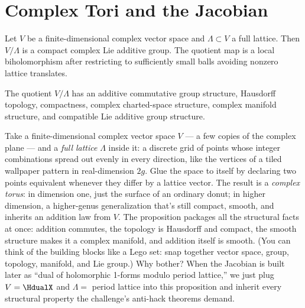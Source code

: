 \section{Complex Tori and the Jacobian}
\label{sec:complex-tori-jacobians}

Let \(V\) be a finite-dimensional complex vector space and \(\Lambda\subset V\)
a full lattice. Then \(V/\Lambda\) is a compact complex Lie additive group.
The quotient map is a local biholomorphism after restricting to sufficiently
small balls avoiding nonzero lattice translates.

\begin{proposition}
\label{prop:complex-torus-package}
The quotient \(V/\Lambda\) has an additive commutative group structure,
Hausdorff topology, compactness, complex charted-space structure, complex
manifold structure, and compatible Lie additive group structure.
\leanok
\end{proposition}

\begin{layman}
Take a finite-dimensional complex vector space \(V\) — a few copies of
the complex plane — and a \emph{full lattice} \(\Lambda\) inside it: a
discrete grid of points whose integer combinations spread out evenly in
every direction, like the vertices of a tiled wallpaper pattern in
real-dimension \(2g\). Glue the space to itself by declaring two points
equivalent whenever they differ by a lattice vector. The result is a
\emph{complex torus}: in dimension one, just the surface of an ordinary
donut; in higher dimension, a higher-genus generalization that's still
compact, smooth, and inherits an addition law from \(V\). The
proposition packages all the structural facts at once: addition
commutes, the topology is Hausdorff and compact, the smooth structure
makes it a complex manifold, and addition itself is smooth. (You can
think of the building blocks like a Lego set: snap together vector
space, group, topology, manifold, and Lie group.) Why bother? When the
Jacobian is built later as ``dual of holomorphic 1-forms modulo period
lattice,'' we just plug \(V = \HdualX\) and \(\Lambda = \) period
lattice into this proposition and inherit every structural property
the challenge's anti-hack theorems demand.
\end{layman}

